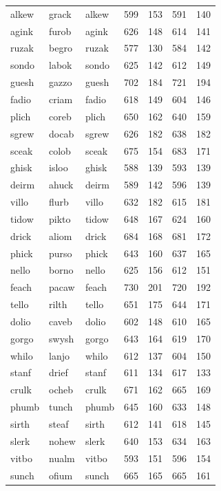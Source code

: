 \documentclass[
]{interact}
\begin{document}
\begin{longtable*}{lllrrrr}
\midrule\addlinespace[2.5pt]
 \\ 
\midrule\addlinespace[2.5pt]
alkew & grack & alkew & 599 & 153 & 591 & 140 \\ 
agink & furob & agink & 626 & 148 & 614 & 141 \\ 
ruzak & begro & ruzak & 577 & 130 & 584 & 142 \\ 
sondo & labok & sondo & 625 & 142 & 612 & 149 \\ 
guesh & gazzo & guesh & 702 & 184 & 721 & 194 \\ 
fadio & criam & fadio & 618 & 149 & 604 & 146 \\ 
plich & coreb & plich & 650 & 162 & 640 & 159 \\ 
sgrew & docab & sgrew & 626 & 182 & 638 & 182 \\ 
sceak & colob & sceak & 675 & 154 & 683 & 171 \\ 
ghisk & isloo & ghisk & 588 & 139 & 593 & 139 \\ 
deirm & ahuck & deirm & 589 & 142 & 596 & 139 \\ 
villo & flurb & villo & 632 & 182 & 615 & 181 \\ 
tidow & pikto & tidow & 648 & 167 & 624 & 160 \\ 
drick & aliom & drick & 684 & 168 & 681 & 172 \\ 
phick & purso & phick & 643 & 160 & 637 & 165 \\ 
nello & borno & nello & 625 & 156 & 612 & 151 \\ 
feach & pacaw & feach & 730 & 201 & 720 & 192 \\ 
tello & rilth & tello & 651 & 175 & 644 & 171 \\ 
dolio & caveb & dolio & 602 & 148 & 610 & 165 \\ 
gorgo & swysh & gorgo & 643 & 164 & 619 & 170 \\ 
whilo & lanjo & whilo & 612 & 137 & 604 & 150 \\ 
stanf & drief & stanf & 611 & 134 & 617 & 133 \\ 
crulk & ocheb & crulk & 671 & 162 & 665 & 169 \\ 
phumb & tunch & phumb & 645 & 160 & 633 & 148 \\ 
sirth & steaf & sirth & 612 & 141 & 618 & 145 \\ 
slerk & nohew & slerk & 640 & 153 & 634 & 163 \\ 
vitbo & nualm & vitbo & 593 & 151 & 596 & 154 \\ 
sunch & ofium & sunch & 665 & 165 & 665 & 161 \\ 

\end{longtable*}
\end{document}
